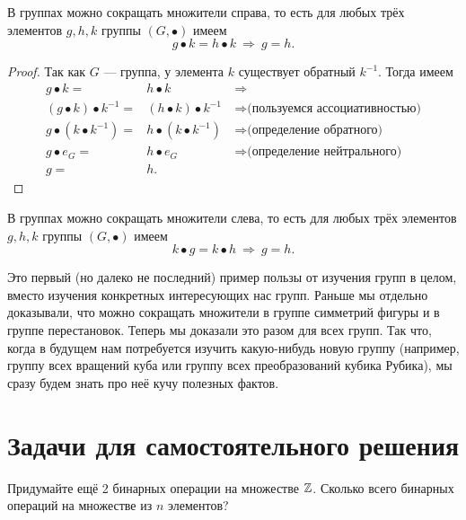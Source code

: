 \documentclass[a4paper,12pt]{article}
\begin{document}
\begin{theorem} \label{right_cancellation}
    В группах можно сокращать множители справа, то есть для любых трёх элементов $g, h, k$ группы $(G, \bullet)$ имеем
    \begin{equation*}
        g \bullet k = h \bullet k \ \Rightarrow \ g = h.
    \end{equation*}
\end{theorem}
\begin{proof}
    Так как $G$ --- группа, у элемента $k$ существует обратный $k^{-1}$. Тогда имеем
    \begin{eqnarray*}
        g \bullet k =& h \bullet k \ &\Rightarrow \\ 
        (g \bullet k) \bullet k^{-1} =& (h \bullet k) \bullet k^{-1} \ &\Rightarrow \text{(пользуемся ассоциативностью)} \\
        g \bullet (k \bullet k^{-1}) =& h \bullet (k \bullet k^{-1}) \ &\Rightarrow \text{(определение обратного)} \\
        g \bullet e_G =& h \bullet e_G \ &\Rightarrow \text{(определение нейтрального)} \\
        g =& h.
    \end{eqnarray*}
\end{proof}
    \begin{theorem} \label{left_cancellation}
        В группах можно сокращать множители слева, то есть для любых трёх элементов $g, h, k$ группы $(G, \bullet)$ имеем
        \begin{equation*}
            k \bullet g = k \bullet h \ \Rightarrow \ g = h.
        \end{equation*}
    \end{theorem}
    Это первый (но далеко не последний) пример пользы от изучения групп в целом, вместо изучения конкретных интересующих нас групп. Раньше мы отдельно доказывали, что можно сокращать множители в группе симметрий фигуры и в группе перестановок. Теперь мы доказали это разом для всех групп. Так что, когда в будущем нам потребуется изучить какую-нибудь новую группу (например, группу всех вращений куба или группу всех преобразований кубика Рубика), мы сразу будем знать про неё кучу полезных фактов.

    \section{Задачи для самостоятельного решения}
    
    \problem Придумайте ещё 2 бинарных операции на множестве $\mathbb{Z}$.
    \problem Сколько всего бинарных операций на множестве из $n$ элементов?
    
\end{document}
